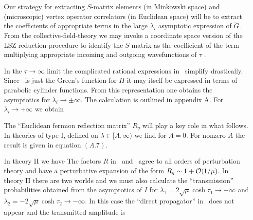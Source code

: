 Our strategy for extracting $S$-matrix elements (in Minkowski space) and
(microscopic) vertex operator correlators (in Euclidean space) 
will be to extract
the coefficients of appropriate terms in the large $\lambda_i$
asymptotic expression of $\tilde G$.
From the collective-field-theory we may invoke a coordinate space
version of the LSZ reduction procedure to
identify the
$S$-matrix as the coefficient of the term multiplying
appropriate incoming and outgoing wavefunctions of $\tau$
\nref{}%
\nref{}%
.
 
In the $\tau\to\infty$ limit the complicated rational
expressions in \expdi\ simplify drastically.
Since \iasfg\ is just the Green's function for $H$ it may itself
be expressed in terms
of parabolic cylinder functions. From this
representation one obtains the asymptotics
for $\lambda_i\to \pm \infty$. The calculation is outlined in appendix A.
For $\lambda_i\to+\infty$ we obtain
\eqn{}
 
The ``Euclidean fermion reflection matrix'' $R_q$ will play a key 
role in what follows.  
In theories of type I, defined on $\lambda\in [A,\infty)$ we find
\eqn{}
for $A=0$. For nonzero $A$ the result is given in 
equation $(A.7)$. 
 
In theory II we have
\eqn{}
The factors $R$ in \gamhf\ and \gmfrm\ agree to all orders of 
perturbation theory
\eqn{}
and have a perturbative expansion of the form $R_q\sim 1 + {\cal O}(1/\mu)$.
In theory II there are two worlds and we must also calculate the 
``transmission''
probabilities obtained from the asymptotics of $I$ for
$\lambda_1=2\sqrt{\mu}\cosh\tau_1\to+\infty$ and
$\lambda_2=-2\sqrt{\mu}\cosh\tau_2\to-\infty$. In this case the ``direct
propagator'' in \asympi\ does not appear and the transmitted
amplitude is
\eqn{}
 
